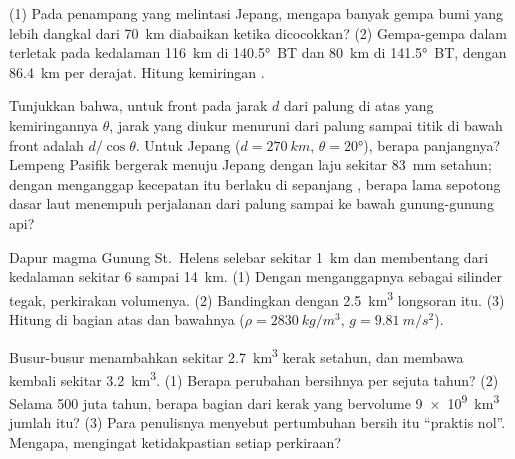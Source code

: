 \begin{exercise}[$\star\star$]\label{exo:g12:subduction-magmatism:11}
(1) Pada penampang yang melintasi Jepang, mengapa banyak gempa bumi yang lebih
dangkal dari \qty{70}{km} diabaikan ketika  dicocokkan? (2) Gempa-gempa
dalam terletak pada kedalaman \qty{116}{km} di \ang{140.5}~BT dan \qty{80}{km}
di \ang{141.5}~BT, dengan \qty{86.4}{km} per derajat. Hitung kemiringan
.
\end{exercise}

\begin{exercise}[$\star\star\star$]\label{exo:g12:subduction-magmatism:12}
Tunjukkan bahwa, untuk front pada jarak $d$ dari palung di atas  yang
kemiringannya $\theta$, jarak yang diukur menuruni  dari palung sampai
titik di bawah front adalah $d/\cos\theta$. Untuk Jepang ($d = \qty{270}{km}$,
$\theta = \ang{20}$), berapa panjangnya? Lempeng Pasifik bergerak menuju
Jepang dengan laju sekitar \qty{83}{mm} setahun; dengan menganggap kecepatan
itu berlaku di sepanjang , berapa lama sepotong dasar laut menempuh
perjalanan dari palung sampai ke bawah gunung-gunung api?
\end{exercise}

\begin{exercise}[$\star\star\star$]\label{exo:g12:subduction-magmatism:13}
Dapur magma Gunung St.~Helens selebar sekitar \qty{1}{km} dan membentang dari
kedalaman sekitar 6 sampai \qty{14}{km}. (1) Dengan menganggapnya sebagai
silinder tegak, perkirakan volumenya. (2) Bandingkan dengan \qty{2.5}{km^3}
longsoran itu. (3) Hitung  di bagian atas dan bawahnya ($\rho =
\qty{2830}{kg/m^3}$, $g = \qty{9.81}{m/s^2}$).
\end{exercise}

\begin{exercise}[$\star\star\star$]\label{exo:g12:subduction-magmatism:14}
Busur-busur menambahkan sekitar \qty{2.7}{km^3} kerak setahun, dan  membawa kembali sekitar \qty{3.2}{km^3}. (1) Berapa perubahan bersihnya
per sejuta tahun? (2) Selama 500 juta tahun, berapa bagian dari kerak yang
bervolume \qty{9e9}{km^3} jumlah itu? (3) Para penulisnya menyebut pertumbuhan
bersih itu ``praktis nol''. Mengapa, mengingat ketidakpastian setiap perkiraan?
\end{exercise}


